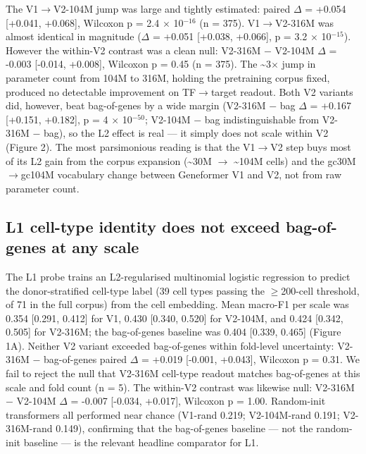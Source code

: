 \documentclass[10pt]{article}
\begin{document}
The V1$\to$V2-104M jump was large and tightly estimated: paired $\Delta$ = +0.054
{[}+0.041, +0.068{]}, Wilcoxon p = 2.4 $\times$ 10$^{-16}$ (n = 375). V1$\to$V2-316M was
almost identical in magnitude ($\Delta$ = +0.051 {[}+0.038, +0.066{]}, p = 3.2
$\times$ 10$^{-15}$). However the within-V2 contrast was a clean null: V2-316M $-$
V2-104M $\Delta$ = -0.003 {[}-0.014, +0.008{]}, Wilcoxon p = 0.45 (n = 375).
The \textasciitilde3$\times$ jump in parameter count from 104M to 316M, holding
the pretraining corpus fixed, produced no detectable improvement on
TF$\to$target readout. Both V2 variants did, however, beat bag-of-genes by a
wide margin (V2-316M $-$ bag $\Delta$ = +0.167 {[}+0.151, +0.182{]}, p = 4 $\times$
10$^{-50}$; V2-104M $-$ bag indistinguishable from V2-316M $-$ bag), so the L2
effect is real --- it simply does not scale within V2 (Figure 2). The
most parsimonious reading is that the V1$\to$V2 step buys most of its L2
gain from the corpus expansion (\textasciitilde30M $\to$ \textasciitilde104M
cells) and the gc30M$\to$gc104M vocabulary change between Geneformer V1 and
V2, not from raw parameter count.

\subsection{L1 cell-type identity does not exceed bag-of-genes at
any
scale}\label{l1-cell-type-identity-does-not-exceed-bag-of-genes-at-any-scale}

The L1 probe trains an L2-regularised multinomial logistic regression to
predict the donor-stratified cell-type label (39 cell types passing the
$\geq$200-cell threshold, of 71 in the full corpus) from the cell embedding.
Mean macro-F1 per scale was 0.354 {[}0.291, 0.412{]} for V1, 0.430
{[}0.340, 0.520{]} for V2-104M, and 0.424 {[}0.342, 0.505{]} for
V2-316M; the bag-of-genes baseline was 0.404 {[}0.339, 0.465{]} (Figure
1A). Neither V2 variant exceeded bag-of-genes within fold-level
uncertainty: V2-316M $-$ bag-of-genes paired $\Delta$ = +0.019 {[}-0.001,
+0.043{]}, Wilcoxon p = 0.31. We fail to reject the null that V2-316M
cell-type readout matches bag-of-genes at this scale and fold count (n =
5). The within-V2 contrast was likewise null: V2-316M $-$ V2-104M $\Delta$ =
-0.007 {[}-0.034, +0.017{]}, Wilcoxon p = 1.00. Random-init transformers
all performed near chance (V1-rand 0.219; V2-104M-rand 0.191;
V2-316M-rand 0.149), confirming that the bag-of-genes baseline --- not
the random-init baseline --- is the relevant headline comparator for L1.
\end{document}
